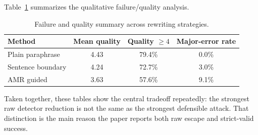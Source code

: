 Table~\ref{tab:app_failure} summarizes the qualitative failure/quality analysis.

\begin{table}[H]
\centering
\begin{tabular}{lccc}
\toprule
Method & Mean quality & Quality $\geq 4$ & Major-error rate \\
\midrule
Plain paraphrase & 4.43 & 79.4\% & 0.0\% \\
Sentence boundary & 4.24 & 72.7\% & 3.0\% \\
AMR guided & 3.63 & 57.6\% & 9.1\% \\
\bottomrule
\end{tabular}
\caption{Failure and quality summary across rewriting strategies.}
\label{tab:app_failure}
\end{table}

Taken together, these tables show the central tradeoff repeatedly: the strongest raw detector reduction is not the same as the strongest defensible attack. That distinction is the main reason the paper reports both raw escape and strict-valid success.
